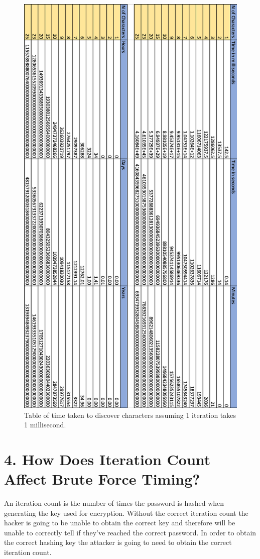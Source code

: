 \documentclass[a4paper, twoside, 11pt]{article}
\begin{document}
\begin{figure}[H]
	\centering
	\includegraphics[scale=0.9]{Images/timeEstimationImage.png}
	\caption{Table of time taken to discover characters assuming 1 iteration takes 1 millisecond.}
\end{figure}

\section*{4. How Does Iteration Count Affect Brute Force Timing?}
An iteration count is the number of times the password is hashed when generating the key used for encryption.
  Without the correct iteration count the hacker is going to be unable to obtain the correct key and
  therefore will be unable to correctly tell if they've reached the correct password. 
  In order to obtain the correct hashing key the attacker is going to need to obtain the correct iteration count.
\end{document}
